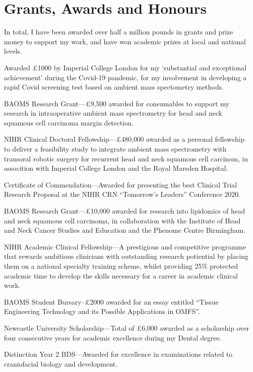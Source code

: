 \section*{Grants, Awards and Honours}

In total, I have been awarded over half a million pounds in grants and prize money to support my work, and have won academic prizes at local and national levels.

 Awarded \pounds1000 by Imperial College London for my `substantial and exceptional achievement' during the Covid-19 pandemic, for my involvement in developing a rapid Covid screening test based on ambient mass spectometry methods.

 BAOMS Research Grant---\pounds9,500 awarded for consumables to support my research in intraoperative ambient mass spectrometry for head and neck squamous cell carcinoma margin detection.

 NIHR Clinical Doctoral Fellowship---\pounds480,000 awarded as a personal fellowship to deliver a feasibility study to integrate ambient mass spectrometry with transoral robotic surgery for recurrent head and neck squamous cell carcinom, in assocition with Imperial College London and the Royal Marsden Hospital.

 Certificate of Commendation---Awarded for presenting the best Clinical Trial Research Proposal at the NIHR CRN ``Tomorrow's Leaders'' Conference 2020.

 BAOMS Research Grant---\pounds10,000 awarded for research into lipidomics of head and neck squamous cell carcinoma, in collaboration with the Institute of Head and Neck Cancer Studies and Education and the Phenome Centre Birmingham.

 NIHR Academic Clinical Fellowship---A prestigious and competitive programme that rewards ambitious clinicians with outstanding research potiential by placing them on a national specialty training scheme, whilst providing 25\% protected academic time to develop the skills necessary for a career in academic clinical work.

 BAOMS Student Bursary--£2000 awarded for an essay entitled “Tissue Engineering Technology and its Possible Applications in OMFS”.

 Newcastle University Scholarship---Total of \pounds6,000 awarded as a scholarship over four consecutive years for academic excellence during my Dental degree.

 Distinction Year 2 BDS---Awarded for excellence in examinations related to craniofacial biology and development.
